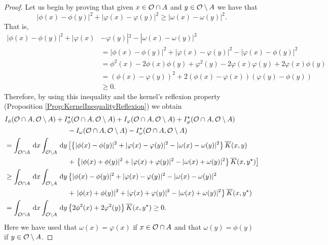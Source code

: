 \begin{proof}
Let us begin by proving that given $x\in \mathcal{O} \cap A$ and $y\in \mathcal{O} \setminus A$ we have that
$$ |\phi(x)-\phi(y)|^2+|\varphi(x)-\varphi(y)|^2\geq |\omega(x)-\omega(y)|^2. $$
That is,
\begin{align*}
|\phi(x)-\phi(y)|^2+|\varphi(x)&-\varphi(y)|^2 - |\omega(x)-\omega(y)|^2 \\
&= |\phi(x)-\phi(y)|^2+|\varphi(x)-\varphi(y)|^2 - |\varphi(x)-\phi(y)|^2 \\
&= \phi^2(x)-2\phi(x)\phi(y)+\varphi^2(y)-2\varphi(x)\varphi(y)+2\varphi(x)\phi(y) \\
&= \left( \phi(x) - \varphi(y)\right) ^2+2\left( \phi(x)-\varphi(x) \right) \left( \varphi(y)-\phi(y) \right) \\
&\geq 0.
\end{align*}
Therefore, by using this inequality and the kernel's reflexion property (Proposition \ref{Prop:KernelInequalityReflexion}) we obtain
\begin{align*}
I_\phi(\ocal\cap A, \ocal \setminus A) &+ I_\phi^\star(\ocal\cap A, \ocal \setminus A) + I_\varphi(\ocal\cap A, \ocal \setminus A) + I_\varphi^\star(\ocal\cap A, \ocal \setminus A) \\
&\hspace{6mm}- I_\omega(\ocal\cap A, \ocal \setminus A) - I_\omega^\star(\ocal\cap A, \ocal \setminus A)\\
&\hspace{-26mm}= \int_{\ocal\cap A} \d x \int_{\ocal\setminus A} \d y \left[\left\{|\phi(x)-\phi(y)|^2+|\varphi(x)-\varphi(y)|^2-|\omega(x)-\omega(y)|^2 \right\} \overline{K}(x,y) \right. \\
&\hspace{6mm}+ \left.\left\{|\phi(x)+\phi(y)|^2+|\varphi(x)+\varphi(y)|^2-|\omega(x)+\omega(y)|^2 \right\} \overline{K}(x,y^\star) \right] \\
&\hspace{-26mm}\geq \int_{\ocal\cap A} \d x \int_{\ocal\setminus A} \d y \left\{|\phi(x)-\phi(y)|^2+|\varphi(x)-\varphi(y)|^2-|\omega(x)-\omega(y)|^2 \right.\\ &\hspace{6mm}+\left.|\phi(x)+\phi(y)|^2+|\varphi(x)+\varphi(y)|^2-|\omega(x)+\omega(y)|^2 \right\} \overline{K}(x,y^\star)  \\
&\hspace{-26mm}= \int_{\ocal\cap A} \d x \int_{\ocal\setminus A} \d y \left\{ 2\phi^2(x)+2\varphi^2(y)\right\} \overline{K}(x,y^\star) \geq 0.
\end{align*}
Here we have used that $\omega(x) = \varphi(x)$ if $x\in \mathcal{O}\cap A$ and that $\omega(y) = \phi(y)$ if $y\in \mathcal{O} \setminus A$.
\end{proof}

